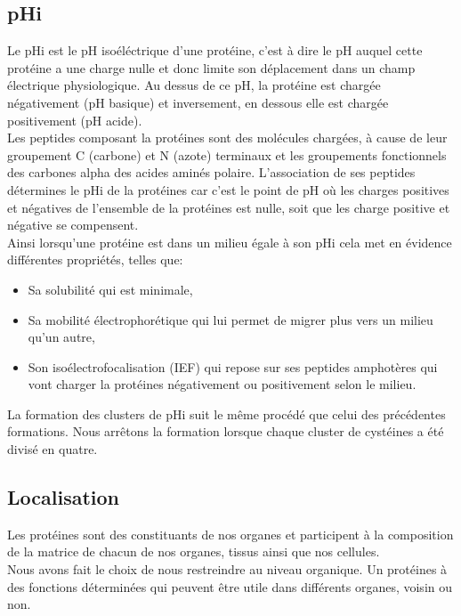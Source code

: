 \subsection*{pHi}
Le pHi est le pH isoéléctrique d'une protéine, c'est à dire le pH auquel cette protéine a une charge nulle et donc limite son déplacement dans un champ électrique physiologique.
Au dessus de ce pH, la protéine est chargée négativement (pH basique) et inversement, en dessous elle est chargée positivement (pH acide).\\
Les peptides composant la protéines sont des molécules chargées, à cause de leur groupement C (carbone) et N (azote) terminaux et les groupements fonctionnels des carbones alpha des acides aminés polaire. L'association de ses peptides détermines le pHi de la protéines car c'est le point de pH où les charges positives et négatives de l'ensemble de la protéines est nulle, soit que les charge positive et négative se compensent.\\
Ainsi lorsqu'une protéine est dans un milieu égale à son pHi cela met en évidence différentes propriétés, telles que:
\begin{itemize}
\item Sa solubilité qui est minimale,
\item Sa mobilité électrophorétique qui lui permet de migrer plus vers un milieu qu'un autre,
\item Son isoélectrofocalisation (IEF) qui repose sur ses peptides amphotères qui vont charger la protéines négativement ou positivement selon le milieu.
\end{itemize}
La formation des clusters de pHi suit le m\^eme procédé que celui des précédentes formations. Nous arr\^etons la formation lorsque chaque cluster de cystéines a été divisé en quatre.

\subsection*{Localisation}
Les protéines sont des constituants de nos organes et participent à la composition de la matrice de chacun de nos organes, tissus ainsi que nos cellules.\\%
Nous avons fait le choix de nous restreindre au niveau organique. Un protéines à des fonctions déterminées qui peuvent être utile dans différents organes, voisin ou non. 
\\

